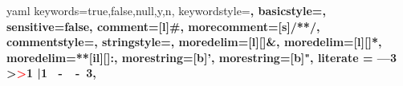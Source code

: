 

\setlength{\bibparsep}{\parskip}		%


%
\usepackage{chngcntr}

\makeatletter
\usepackage[printonlyused]{acronym}
  {%
    \renewcommand*{\aclabelfont}[1]{\textbf{\textsf{\acsfont{#1}}}}
  }%
  {%
  }%
\makeatother

\usepackage{listings}	%
\renewcommand{\lstlistingname}{Quelltext}
\renewcommand{\lstlistlistingname}{Quelltextverzeichnis}

\newcommand\tablstinline[2][]{\lstinline[#1]{#2}}


\usepackage{color}
\newcommand\YAMLcolonstyle{\color{red}\mdseries}
\newcommand\YAMLkeystyle{\color{black}\bfseries}
\newcommand\YAMLvaluestyle{\color{black}\mdseries}

\makeatletter

\newcommand\language@yaml{yaml}

\expandafter\expandafter\expandafter\lstdefinelanguage
\expandafter{\language@yaml}
{
	keywords={true,false,null,y,n},
	keywordstyle=\color{darkgray}\bfseries,
	basicstyle=\YAMLkeystyle,                                 %
	sensitive=false,
	comment=[l]{\#},
	morecomment=[s]{/*}{*/},
	commentstyle=\color{purple}\ttfamily,
	stringstyle=\YAMLvaluestyle\ttfamily,
	moredelim=[l][\color{orange}]{\&},
	moredelim=[l][\color{magenta}]{*},
	moredelim=**[il][\YAMLcolonstyle{:}\YAMLvaluestyle]{:},   %
	morestring=[b]',
	morestring=[b]",
	literate =    {---}{{\ProcessThreeDashes}}3
	{>}{{\textcolor{red}\textgreater}}1     
	{|}{{\textcolor{red}\textbar}}1 
	{\ -\ }{{\mdseries\ -\ }}3,
}

